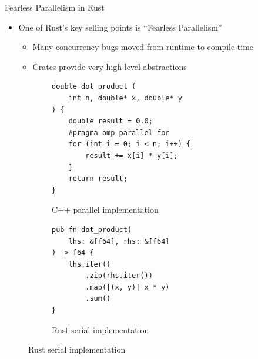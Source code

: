 \documentclass[10pt,aspectratio=169]{beamer}
\begin{document}
\begin{frame}[fragile]{Fearless Parallelism in Rust}
    \begin{itemize}
        \item One of Rust's key selling points is ``Fearless Parallelism''
        \begin{itemize}
            \item Many concurrency bugs moved from runtime to compile-time
            \item Crates provide very high-level abstractions
        \end{itemize}
    \end{itemize}    
    \vspace*{0.15cm}

    \begin{figure}
        \begin{subfigure}[c]{.55\textwidth}\centering
            \begin{verbatim}
double dot_product (
    int n, double* x, double* y
) {
    double result = 0.0;
    #pragma omp parallel for
    for (int i = 0; i < n; i++) {
        result += x[i] * y[i];
    }
    return result;
}
            \end{verbatim}
            \label{fig:cpp-ddot-openmp-race}
            \caption{C++ parallel implementation}
             {
            }
        \end{subfigure}%
        \begin{subfigure}[c]{.45\textwidth}\centering
            \begin{verbatim}
pub fn dot_product(
    lhs: &[f64], rhs: &[f64]
) -> f64 {
    lhs.iter()
        .zip(rhs.iter())
        .map(|(x, y)| x * y)
        .sum()
}
            \end{verbatim}
            \label{fig:rust-ddot-serial-2}
            \vspace*{0.5cm}
            \caption{Rust serial implementation}
        \end{subfigure}
    \end{figure}
\end{frame}
\end{document}
